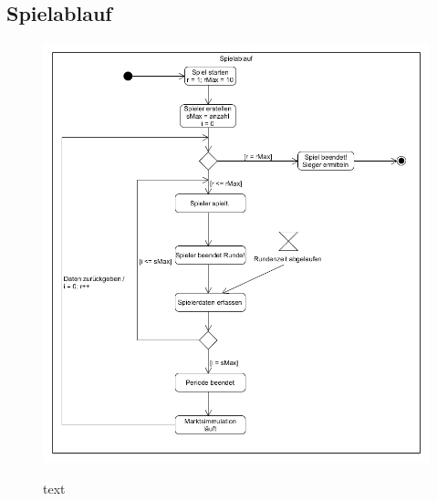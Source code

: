 \subsection{Spielablauf}
\begin{figure} [!h]
	\centering
	\includegraphics[scale=0.5]{img/Spielablauf.png} 
	\label{key}
	\caption{text}
\end{figure}





